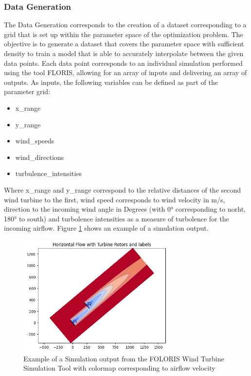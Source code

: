 \subsubsection{Data Generation}

The Data Generation corresponds to the creation of a dataset corresponding to a grid that is set up within the parameter space of the optimization problem. The objective is to generate a dataset that covers the parameter space with sufficient density to train a model that is able to accurately interpolate between the given data points. Each  data point corresponds to an individual simulation performed using the tool FLORIS, allowing for an array of inputs and delivering an array of outputs. As inputs, the following variables can be defined as part of the parameter grid:

\begin{itemize}
	\item x\_range
	\item y\_range
	\item wind\_speeds
	\item wind\_directions
	\item turbulence\_intensities
\end{itemize}

Where x\_range and y\_range correspond to the relative distances of the second wind turbine to the first, wind speed corresponds to wind velocity in m/s,  direction to the incoming wind angle in Degrees (with 0° corresponding to norht, 180° to south) and turbolence intensities as a measure of turbolence for the incoming airflow. Figure \ref{fig:Floris} shows an example of a simulation output. 


\begin{figure}[h] 
	\centering
	\includegraphics[width=0.7\textwidth]{figures/modelling/Floris.png} 
	\caption{Example of a Simulation output from the FOLORIS Wind Turbine Simulation Tool with colormap corresponding to airflow velocity}
	\label{fig:Floris}
\end{figure}

